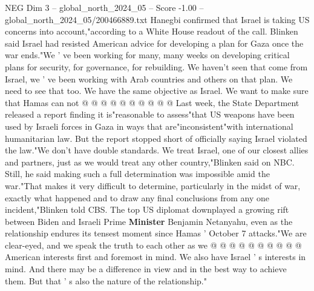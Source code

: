 \begin{textsample}{NEG Dim 3 – global\_north\_2024\_05 – Score -1.00 – global\_north\_2024\_05/200466889.txt}
Hanegbi confirmed that Israel is taking US concerns into account,"according to a White House readout of the call.
Blinken said Israel had resisted American advice for developing a plan for Gaza once the war ends."We ' ve been working for many, many weeks on developing critical plans for security, for governance, for rebuilding.
We haven't seen that come from Israel, we ' ve been working with Arab countries and others on that plan.
We need to see that too.
We have the same objective as Israel.
We want to make sure that Hamas can not @ @ @ @ @ @ @ @ @ @ Last week, the State Department released a report finding it is"reasonable to assess"that US weapons have been used by Israeli forces in Gaza in ways that are"inconsistent"with international humanitarian law.
But the report stopped short of officially saying Israel violated the law."We don't have double standards.
We treat Israel, one of our closest allies and partners, just as we would treat any other country,"Blinken said on NBC.
Still, he said making such a full determination was impossible amid the war."That makes it very difficult to determine, particularly in the midst of war, exactly what happened and to draw any final conclusions from any one incident,"Blinken told CBS.
The top US diplomat downplayed a growing rift between Biden and Israeli Prime \textbf{Minister} Benjamin Netanyahu, even as the relationship endures its tensest moment since Hamas ' October 7 attacks."We are clear-eyed, and we speak the truth to each other as we @ @ @ @ @ @ @ @ @ @ American interests first and foremost in mind.
We also have Israel ' s interests in mind.
And there may be a difference in view and in the best way to achieve them.
But that ' s also the nature of the relationship."

\end{textsample}
